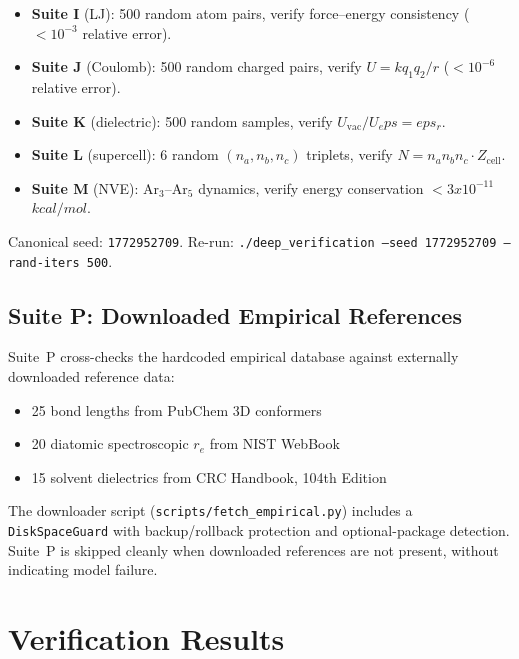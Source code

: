 \documentclass[11pt,twoside]{article}
\def\times{x}%
\def\varepsilon{eps}%
\def\kcalmol{kcal/mol}%
\newcommand{\kcalmol}{\text{kcal/mol}}
\newcommand{\file}[1]{\texttt{#1}}
\begin{document}
\begin{itemize}
  \item \textbf{Suite I} (LJ): 500 random atom pairs, verify force--energy consistency ($< 10^{-3}$ relative error).
  \item \textbf{Suite J} (Coulomb): 500 random charged pairs, verify $U = kq_1q_2/r$ ($< 10^{-6}$ relative error).
  \item \textbf{Suite K} (dielectric): 500 random samples, verify $U_{\mathrm{vac}}/U_\varepsilon = \varepsilon_r$.
  \item \textbf{Suite L} (supercell): 6 random $(n_a, n_b, n_c)$ triplets, verify $N = n_a n_b n_c \cdot Z_{\mathrm{cell}}$.
  \item \textbf{Suite M} (NVE): Ar$_3$--Ar$_5$ dynamics, verify energy conservation $< 3 \times 10^{-11}$~$\kcalmol$.
\end{itemize}

Canonical seed: \texttt{1772952709}. Re-run: \texttt{./deep\_verification --seed 1772952709 --rand-iters 500}.

\subsection{Suite P: Downloaded Empirical References}

Suite~P cross-checks the hardcoded empirical database against externally downloaded reference data:

\begin{itemize}
  \item 25 bond lengths from PubChem 3D conformers
  \item 20 diatomic spectroscopic $r_e$ from NIST WebBook
  \item 15 solvent dielectrics from CRC Handbook, 104th Edition
\end{itemize}

The downloader script (\file{scripts/fetch\_empirical.py}) includes a \texttt{DiskSpaceGuard} with backup/rollback protection and optional-package detection. Suite~P is skipped cleanly when downloaded references are not present, without indicating model failure.


\section{Verification Results}
\label{sec:results}
\end{document}
